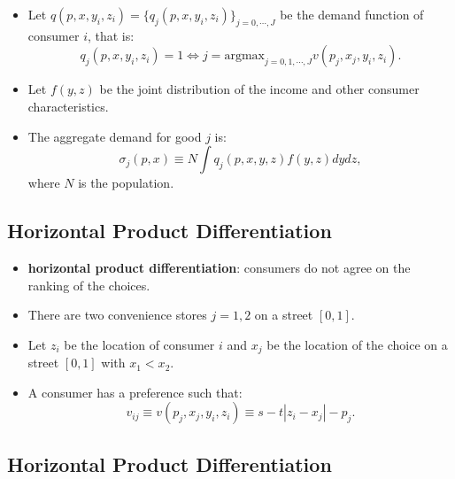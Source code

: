 \documentclass[
]{book}
\providecommand{\tightlist}{%
  \setlength{\itemsep}{0pt}\setlength{\parskip}{0pt}}
\begin{document}
\begin{itemize}
\tightlist
\item
  Let \(q(p, x, y_i, z_i) = \{q_j(p, x, y_i, z_i)\}_{j = 0, \cdots, J}\) be the demand function of consumer \(i\), that is:
  \begin{equation}
  q_j(p, x, y_i, z_i) = 1 \Leftrightarrow j = \text{argmax}_{j = 0, 1, \cdots, J}  v(p_j, x_j, y_i, z_i).
  \end{equation}
\item
  Let \(f(y, z)\) be the joint distribution of the income and other consumer characteristics.
\item
  The aggregate demand for good \(j\) is:
  \begin{equation}
  \sigma_j(p, x) \equiv N \int  q_j(p, x, y, z) f(y, z) dy dz,
  \end{equation}
  where \(N\) is the population.
\end{itemize}

\hypertarget{horizontal-product-differentiation}{%
\subsection{Horizontal Product Differentiation}\label{horizontal-product-differentiation}}

\begin{itemize}
\tightlist
\item
  \textbf{horizontal product differentiation}: consumers do not agree on the ranking of the choices.
\item
  There are two convenience stores \(j = 1, 2\) on a street \([0, 1]\).
\item
  Let \(z_i\) be the location of consumer \(i\) and \(x_j\) be the location of the choice on a street \([0, 1]\) with \(x_1 < x_2\).
\item
  A consumer has a preference such that:
  \begin{equation}
  v_{ij} \equiv v(p_j, x_j, y_i, z_i) \equiv s - t |z_i - x_j| - p_j.
  \end{equation}
\end{itemize}

\hypertarget{horizontal-product-differentiation-1}{%
\subsection{Horizontal Product Differentiation}\label{horizontal-product-differentiation-1}}
\end{document}
